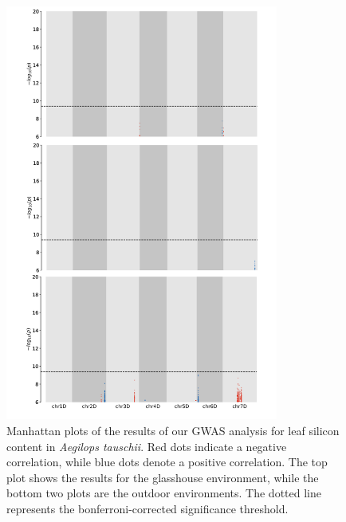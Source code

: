 \documentclass[12pt, letterpaper, ]{report}
\begin{document}
\begin{figure}[h]
        \centering
        \includegraphics[width=0.8\textwidth]{images/gwas_plots/svgtopng/si_manhattan_plots.png}
        \caption{Manhattan plots of the results of our GWAS analysis for leaf silicon content in \textit{Aegilops tauschii}. Red dots indicate a negative correlation, while blue dots denote a positive correlation. The top plot shows the results for the glasshouse environment, while the bottom two plots are the outdoor environments. The dotted line represents the bonferroni-corrected significance threshold.}
        \label{Fig:si_peak_plot}
\end{figure}
\end{document}

